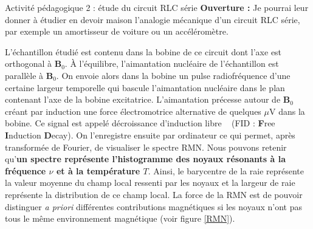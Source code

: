 \begin{highlightBlock}{Activité pédagogique 2 : étude du circuit RLC série}
\textbf{Ouverture :} Je pourrai leur donner à étudier en devoir maison l'analogie mécanique d'un circuit RLC série, par exemple un amortisseur de voiture ou un accéléromètre.

\end{highlightBlock}
L'échantillon étudié est contenu dans la bobine de ce circuit dont l'axe est orthogonal à $\mathbf{B}_0$. \`{A} l'équilibre, l'aimantation nucléaire de l'échantillon est parallèle à $\mathbf{B}_0$. On envoie alors dans la bobine un pulse radiofréquence d'une certaine largeur temporelle qui bascule l'aimantation nucléaire dans le plan contenant l'axe de la bobine excitatrice. L'aimantation précesse autour de $\mathbf{B}_0$ créant par induction une force électromotrice alternative de quelques $\mu$V dans la bobine. Ce signal est appelé \og décroissance d'induction libre \fg ~ (FID : \textbf{F}ree \textbf{I}nduction \textbf{D}ecay). On l'enregistre ensuite par ordinateur ce qui permet, après transformée de Fourier, de visualiser le spectre RMN. Nous pouvons retenir qu'\textbf{un spectre représente l'histogramme des noyaux résonants à la fréquence $\nu$ et à la température $T$}. Ainsi, le barycentre de la raie représente la valeur moyenne du champ local ressenti par les noyaux et la largeur de raie représente la distribution de ce champ local. La force de la RMN est de pouvoir distinguer \textit{a priori} différentes contributions magnétiques si les noyaux n'ont pas tous le même environnement magnétique (voir figure \ref{RMN}). \\
